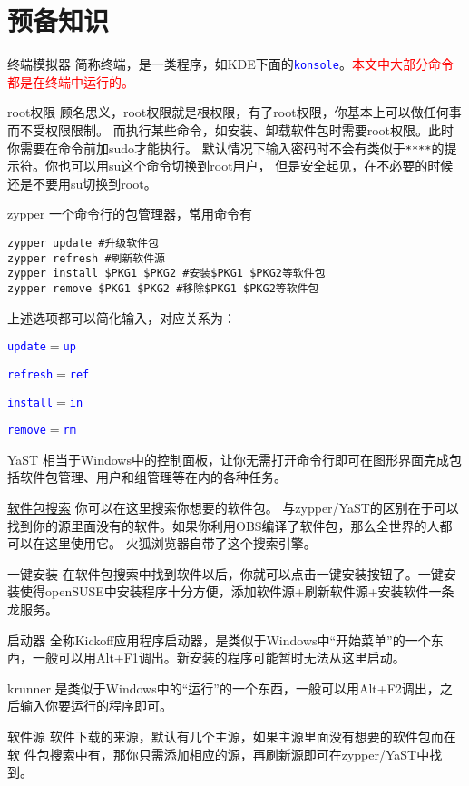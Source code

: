 \documentclass[11pt]{article}
\newcommand{\command}[1]{\texttt{\textcolor{blue}{#1}}}
\newcommand{\soft}[1]{\texttt{\textcolor{blue}{#1}}}
\newcommand{\simp}[2]{\command{#1}$=$\command{#2}}
\begin{document}
\section{预备知识}
\begin{compactdesc}
\item[终端模拟器] 简称终端，是一类程序，如KDE下面的\soft{konsole}。\textcolor{red}{本文中大部分命令都是在终端中运行的。}
\item[root权限] 顾名思义，root权限就是根权限，有了root权限，你基本上可以做任何事而不受权限限制。
而执行某些命令，如安装、卸载软件包时需要root权限。此时你需要在命令前加sudo才能执行。
默认情况下输入密码时不会有类似于\texttt{****}的提示符。你也可以用su这个命令切换到root用户，
但是安全起见，在不必要的时候还是不要用su切换到root。
\label{pre}\item[zypper] 一个命令行的包管理器，常用命令有
\begin{Verbatim}[formatcom=\color{codecolor}]
zypper update #升级软件包
zypper refresh #刷新软件源
zypper install $PKG1 $PKG2 #安装$PKG1 $PKG2等软件包
zypper remove $PKG1 $PKG2 #移除$PKG1 $PKG2等软件包
\end{Verbatim}
上述选项都可以简化输入，对应关系为：\\
\begin{inparaitem}
 \item \simp{update}{up}
 \item \simp{refresh}{ref}
 \item \simp{install}{in}
 \item \simp{remove}{rm}
\end{inparaitem}
\item[YaST] 相当于Windows中的控制面板，让你无需打开命令行即可在图形界面完成包括软件包管理、用户和组管理等在内的各种任务。
\item[\href{http://software.opensuse.org/packages}{软件包搜索}] 你可以在这里搜索你想要的软件包。
与zypper/YaST的区别在于可以找到你的源里面没有的软件。如果你利用OBS编译了软件包，那么全世界的人都可以在这里使用它。
火狐浏览器自带了这个搜索引擎。
\item[一键安装] 在软件包搜索中找到软件以后，你就可以点击一键安装按钮了。一键安装使得openSUSE中安装程序十分方便，添加软件源+刷新软件源+安装软件一条龙服务。
\item[启动器] 全称Kickoff应用程序启动器，是类似于Windows中“开始菜单”的一个东西，一般可以用Alt+F1调出。新安装的程序可能暂时无法从这里启动。
\item[krunner] 是类似于Windows中的“运行”的一个东西，一般可以用Alt+F2调出，之后输入你要运行的程序即可。
\item[软件源] 软件下载的来源，默认有几个主源，如果主源里面没有想要的软件包而在软
件包搜索中有，那你只需添加相应的源，再刷新源即可在zypper/YaST中找到。
\end{compactdesc}
\end{document}
